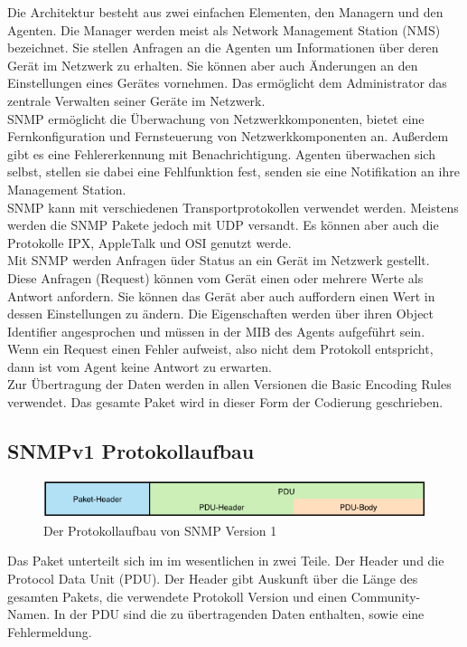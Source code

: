 \documentclass[11pt,a4paper]{article}
\begin{document}
Die Architektur besteht aus zwei einfachen Elementen, den Managern und den Agenten. Die Manager werden meist als Network Management Station (NMS) bezeichnet. Sie stellen Anfragen an die Agenten um Informationen über deren Gerät im Netzwerk zu erhalten. Sie können aber auch Änderungen an den Einstellungen eines Gerätes vornehmen. Das ermöglicht dem Administrator das zentrale Verwalten seiner Geräte im Netzwerk.\\
SNMP ermöglicht die Überwachung von Netzwerkkomponenten, bietet eine Fernkonfiguration und Fernsteuerung von Netzwerkkomponenten an. Außerdem gibt es eine Fehlererkennung mit Benachrichtigung. Agenten überwachen sich selbst, stellen sie dabei eine Fehlfunktion fest, senden sie eine Notifikation an ihre Management Station.\\
SNMP kann mit verschiedenen Transportprotokollen verwendet werden. Meistens werden die SNMP Pakete jedoch mit UDP versandt. Es können aber auch die Protokolle IPX, AppleTalk und OSI genutzt werde.\\
Mit SNMP werden Anfragen üder Status an ein Gerät im Netzwerk gestellt. Diese Anfragen (Request) können vom Gerät einen oder mehrere Werte als Antwort anfordern. Sie können das Gerät aber auch auffordern einen Wert in dessen Einstellungen zu ändern. Die Eigenschaften werden über ihren Object Identifier angesprochen und müssen in der MIB des Agents aufgeführt sein.\\
Wenn ein Request einen Fehler aufweist, also nicht dem Protokoll entspricht, dann ist vom Agent keine Antwort zu erwarten.\\
Zur Übertragung der Daten werden in allen Versionen die Basic Encoding Rules verwendet. Das gesamte Paket wird in dieser Form der Codierung geschrieben.
\\

\subsection{SNMPv1 Protokollaufbau}
\begin{figure}[h]
	\centering
	\includegraphics[scale=.8]{Bilder/SNMPv1-Aufbau.png}
	\caption{Der Protokollaufbau von SNMP Version 1}
\end{figure}
Das Paket unterteilt sich im im wesentlichen in zwei Teile. Der Header und die Protocol Data Unit (PDU). Der Header gibt Auskunft über die Länge des gesamten Pakets, die verwendete Protokoll Version und einen Community-Namen. In der PDU sind die zu übertragenden Daten enthalten, sowie eine Fehlermeldung.\\
\end{document}
